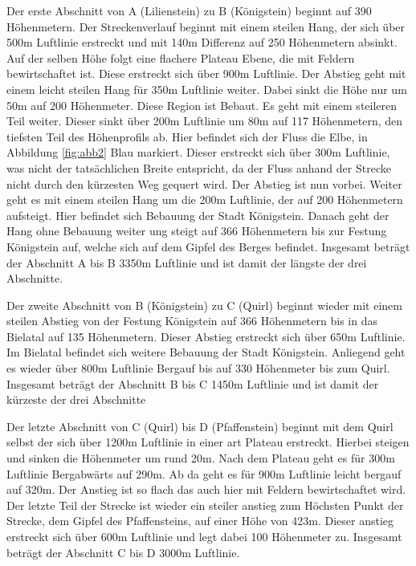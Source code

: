 Der erste Abschnitt von A (Lilienstein) zu B (Königstein) beginnt auf 390 Höhenmetern. Der Streckenverlauf beginnt mit einem steilen Hang, der sich über 500m Luftlinie erstreckt und mit 140m Differenz auf 250 Höhenmetern absinkt. Auf der selben Höhe folgt eine flachere Plateau Ebene, die mit Feldern bewirtschaftet ist. Diese erstreckt sich über 900m Luftlinie. Der Abstieg geht mit einem leicht steilen Hang für 350m Luftlinie weiter. Dabei sinkt die Höhe nur um 50m auf 200 Höhenmeter. Diese Region ist Bebaut. Es geht mit einem steileren Teil weiter. Dieser sinkt über 200m Luftlinie um 80m auf 117 Höhenmetern, den tiefsten Teil des Höhenprofils ab. Hier befindet sich der Fluss die Elbe, in Abbildung \ref{fig:abb2} Blau markiert. Dieser erstreckt sich über 300m Luftlinie, was nicht der tatsächlichen Breite entspricht, da der Fluss anhand der Strecke nicht durch den kürzesten Weg gequert wird.  Der Abstieg ist nun vorbei. Weiter geht es mit einem steilen Hang um die 200m Luftlinie, der auf 200 Höhenmetern aufsteigt. Hier befindet sich Bebauung der Stadt Königstein. Danach geht der Hang ohne Bebauung weiter ung steigt auf 366 Höhenmetern bis zur Festung Königstein auf, welche sich auf dem Gipfel des Berges befindet. Insgesamt beträgt der Abschnitt A bis B 3350m Luftlinie und ist damit der längste der drei Abschnitte.

Der zweite Abschnitt von B (Königstein) zu C (Quirl) beginnt wieder mit einem steilen Abstieg von der Festung Königstein auf 366 Höhenmetern bis in das Bielatal auf 135 Höhenmetern. Dieser Abstieg erstreckt sich über 650m Luftlinie. Im Bielatal befindet sich weitere Bebauung der Stadt Königstein. Anliegend geht es wieder über 800m Luftlinie Bergauf bis auf 330 Höhenmeter bis zum Quirl. Insgesamt beträgt der Abschnitt B bis C 1450m Luftlinie und ist damit der kürzeste der drei Abschnitte

Der letzte Abschnitt von C (Quirl) bis D (Pfaffenstein) beginnt mit dem Quirl selbst der sich über 1200m Luftlinie in einer art Plateau erstreckt. Hierbei steigen und sinken die Höhenmeter um rund 20m. Nach dem Plateau geht es für 300m Luftlinie Bergabwärts auf 290m. Ab da geht es für 900m Luftlinie leicht bergauf auf 320m. Der Anstieg ist so flach das auch hier mit Feldern bewirtschaftet wird. Der letzte Teil der Strecke ist wieder ein steiler anstieg zum Höchsten Punkt der Strecke, dem Gipfel des Pfaffensteins, auf einer Höhe von 423m. Dieser anstieg erstreckt sich über 600m Luftlinie und legt dabei 100 Höhenmeter zu. Insgesamt beträgt der Abschnitt C bis D 3000m Luftlinie.